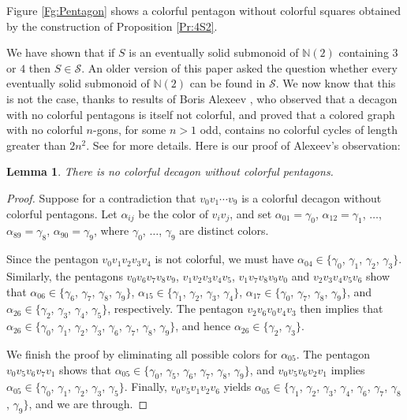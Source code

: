 \documentclass[12pt]{amsart}
\theoremstyle{plain}
\newtheorem{lemma}[theorem]{Lemma}
\numberwithin{equation}{section}
\begin{document}
Figure \ref{Fg:Pentagon} shows a colorful pentagon without colorful squares
obtained by the construction of Proposition \ref{Pr:4S2}.

We have shown that if $S$ is an eventually solid submonoid of $\mathbb{N}(2)$
containing $3$ or $4$ then $S\in\mathcal{S}$. An older version of this paper
asked the question whether every eventually solid submonoid of $\mathbb{N}(2)$
can be found in $\mathcal{S}$. We now know that this is not the case, thanks to
results of Boris Alexeev \cite{Alexeev:2005}, who observed that a decagon with
no colorful pentagons is itself not colorful, and proved that a colored graph
with no colorful $n$-gons, for some $n>1$ odd, contains no colorful cycles of
length greater than $2n^2$. See \cite{Alexeev:2005} for more details. Here is
our proof of Alexeev's observation:

\begin{lemma} There is no colorful decagon without colorful pentagons.
\end{lemma}
\begin{proof}
Suppose for a contradiction that $v_0v_1\cdots v_9$ is a colorful decagon
without colorful pentagons. Let $\alpha_{ij}$ be the color of $v_iv_j$, and set
$\alpha_{01}=\gamma_0$, $\alpha_{12}=\gamma_1$, $\dots$,
$\alpha_{89}=\gamma_8$, $\alpha_{90}=\gamma_9$, where $\gamma_0$, $\dots$,
$\gamma_9$ are distinct colors.

Since the pentagon $v_0v_1v_2v_3v_4$ is not colorful, we must have
$\alpha_{04}\in\{\gamma_0$, $\gamma_1$, $\gamma_2$, $\gamma_3\}$. Similarly,
the pentagons $v_0v_6v_7v_8v_9$, $v_1v_2v_3v_4v_5$, $v_1v_7v_8v_9v_0$ and
$v_2v_3v_4v_5v_6$ show that $\alpha_{06}\in\{\gamma_6$, $\gamma_7$, $\gamma_8$,
$\gamma_9\}$, $\alpha_{15}\in\{\gamma_1$, $\gamma_2$, $\gamma_3$, $\gamma_4\}$,
$\alpha_{17}\in\{\gamma_0$, $\gamma_7$, $\gamma_8$, $\gamma_9\}$, and
$\alpha_{26}\in\{\gamma_2$, $\gamma_3$, $\gamma_4$, $\gamma_5\}$, respectively.
The pentagon $v_2v_6v_0v_4v_3$ then implies that $\alpha_{26}\in\{\gamma_0$,
$\gamma_1$, $\gamma_2$, $\gamma_3$, $\gamma_6$, $\gamma_7$, $\gamma_8$,
$\gamma_9\}$, and hence $\alpha_{26}\in\{\gamma_2$, $\gamma_3\}$.

We finish the proof by eliminating all possible colors for $\alpha_{05}$. The
pentagon $v_0v_5v_6v_7v_1$ shows that $\alpha_{05}\in\{\gamma_0$, $\gamma_5$,
$\gamma_6$, $\gamma_7$, $\gamma_8$, $\gamma_9\}$, and $v_0v_5v_6v_2v_1$ implies
$\alpha_{05}\in\{\gamma_0$, $\gamma_1$, $\gamma_2$, $\gamma_3$, $\gamma_5\}$.
Finally, $v_0v_5v_1v_2v_6$ yields $\alpha_{05}\in\{\gamma_1$, $\gamma_2$,
$\gamma_3$, $\gamma_4$, $\gamma_6$, $\gamma_7$, $\gamma_8$, $\gamma_9\}$, and
we are through.
\end{proof}
\end{document}

